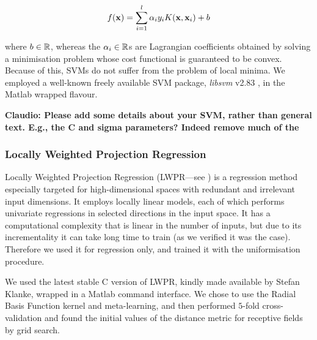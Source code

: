 \begin{equation} \label{eqn:sol}
  f(\xx) = \sum_{i=1}^l \alpha_i y_i K(\xx,\xx_i) + b
\end{equation}

\noindent where $b \in \mathbb{R}$, whereas the $\alpha_i \in \mathbb{R}$s are
Lagrangian coefficients obtained by solving a minimisation problem
whose cost functional is guaranteed to be convex. Because of this,
SVMs do not suffer from the problem of local minima. We employed a
well-known freely available SVM package, \emph{libsvm} v2.83
\cite{ChangL01}, in the Matlab wrapped flavour.


\textbf{Claudio: Please add some details about your SVM, rather than general text.  E.g., the C and sigma parameters? Indeed remove much of the }

\subsubsection{Locally Weighted Projection Regression}

Locally Weighted Projection Regression (LWPR---see \cite{lwpr}) is a
regression method especially targeted for high-dimensional
spaces with redundant and irrelevant input dimensions. It employs
locally linear models, each of which performs univariate regressions
in selected directions in the input space. It has a computational
complexity that is linear in the number of inputs, but due to its
incrementality it can take long time to train (as we verified it was
the case). Therefore we used it for regression only, and trained it
with the uniformisation procedure.

We used the latest stable C version of LWPR, kindly made available by
Stefan Klanke, wrapped in a Matlab command interface. We chose to use
the Radial Basis Function kernel and meta-learning, and then
performed $5$-fold cross-validation and found the initial values of
the distance metric for receptive fields by grid search.
